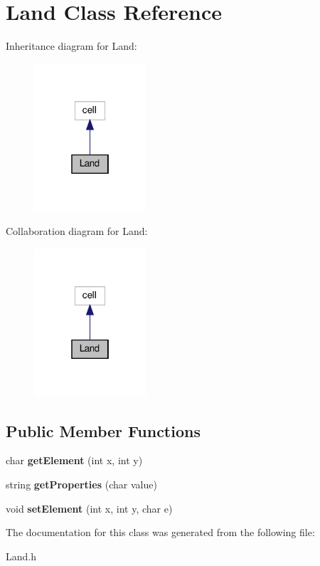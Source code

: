 \hypertarget{classLand}{}\section{Land Class Reference}
\label{classLand}


Inheritance diagram for Land\+:
\nopagebreak
\begin{figure}[H]
\begin{center}
\leavevmode
\includegraphics[width=118pt]{classLand__inherit__graph}
\end{center}
\end{figure}


Collaboration diagram for Land\+:
\nopagebreak
\begin{figure}[H]
\begin{center}
\leavevmode
\includegraphics[width=118pt]{classLand__coll__graph}
\end{center}
\end{figure}
\subsection*{Public Member Functions}
\begin{DoxyCompactItemize}
\item 
\mbox{\label{classLand_a3e3801a879d93123245ea44110bced34}} 
char {\bfseries get\+Element} (int x, int y)
\item 
\mbox{\label{classLand_a777ba38407550c7868a6082913c56749}} 
string {\bfseries get\+Properties} (char value)
\item 
\mbox{\label{classLand_a9d172fde563a0e66ade4defaa70286db}} 
void {\bfseries set\+Element} (int x, int y, char e)
\end{DoxyCompactItemize}


The documentation for this class was generated from the following file\+:\begin{DoxyCompactItemize}
\item 
Land.\+h\end{DoxyCompactItemize}
